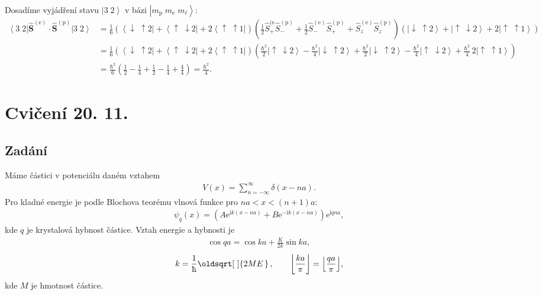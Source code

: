 \documentclass[10pt,a4paper]{article}
\renewcommand*{\sqrt}[2][\ ]{\oldsqrt[#1]{#2\,}\,}
\DeclarePairedDelimiter\floor{\lfloor}{\rfloor}
\newcommand{\const}[1]{\text{#1}}
\newcommand{\bra}[1]{\left< #1 \right|}
\newcommand{\ket}[1]{\left| #1 \right>}
\newcommand{\bhat}[1]{\hat{\bm{#1}}}
\newcommand{\e}[1]{\const{e}^{#1}}
\renewcommand{\i}{\const{i}}
\begin{document}
Dosadíme vyjádření stavu $\ket{3\;2}$ v bázi $\ket{m_\const{p} \; m_\const{e} \; m_\ell}$:
\begin{align*}
    \bra{3 \; 2} \bhat{S}^{(\const{e})} \cdot \bhat{S}^{(\const{p})} \ket{3 \; 2}
    &= \frac{1}{6} \left( \bra{\downarrow \; \uparrow 2} + \bra{\uparrow \; \downarrow 2} + 2 \bra{\uparrow \; \uparrow 1} \right) \left( \frac{1}{2} \hat{S}^{(\const{e}}_{+} \hat{S}^{(\const{p})}_{-} + \frac{1}{2} \hat{S}^{(\const{e})}_{-} \hat{S}^{(\const{p})}_{+} + \hat{S}^{(\const{e})}_z \hat{S}^{(\const{p})}_z \right) \left( \ket{\downarrow \; \uparrow 2} + \ket{\uparrow \; \downarrow 2} + 2 \ket{\uparrow \; \uparrow 1} \right)
    \\
    &= \frac{1}{6} \left( \bra{\downarrow \; \uparrow 2} + \bra{\uparrow \; \downarrow 2} + 2 \bra{\uparrow \; \uparrow 1} \right) \left( \frac{\hbar^2}{2} \ket{\uparrow \; \downarrow 2}  - \frac{\hbar^2}{4} \ket{\downarrow \; \uparrow 2} + \frac{\hbar^2}{2} \ket{\downarrow \; \uparrow 2}  - \frac{\hbar^2}{4} \ket{\uparrow \; \downarrow 2} + \frac{\hbar^2}{4} \, 2 \ket{\uparrow \; \uparrow 1} \right)
    \\[5pt]
    &= \frac{\hbar^2}{6} \left( \frac{1}{2} - \frac{1}{4} + \frac{1}{2} - \frac{1}{4} + \frac{4}{4} \right)
    = \frac{\hbar^2}{4}.
\end{align*}

\pagebreak



\section{Cvičení 20. 11.}

\subsection{Zadání}
Máme částici v potenciálu daném vztahem
\begin{gather*}
    V(x) = \sum_{n=-\infty}^\infty \delta(x-na).
\end{gather*}
Pro kladné energie je podle Blochova teorému vlnová funkce pro $na < x < (n+1)a$:
\begin{gather*}
    \psi_q(x) = \left( A \e{\i k (x-na)} + B \e{-\i k (x-na)} \right)\e{\i q n a},
\end{gather*}
kde $q$ je krystalová hybnost částice. Vztah energie a hybnosti je
\begin{gather}
    \cos qa = \cos ka + \frac{K}{2k} \sin ka,
    \label{implicitni-qE}
\end{gather}
\begin{gather*}
    k = \frac{1}{\hbar} \sqrt{2ME},
    \hspace{2em}
    \floor*{\frac{ka}{\pi}} = \floor*{\frac{qa}{\pi}},
\end{gather*}
kde $M$ je hmotnost částice.
\end{document}
